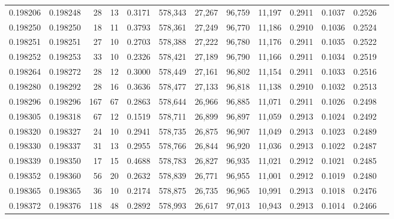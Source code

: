 \begin{tabular}{rrrrrrrrrrrrr}
0.198206 & 0.198248 &    28 &  13 &                                     0.3171 & 578,343 &  27,267 &  96,759 &  11,197 & 0.2911 & 0.1037 & 0.2526 \\
0.198250 & 0.198250 &    18 &  11 &                                     0.3793 & 578,361 &  27,249 &  96,770 &  11,186 & 0.2910 & 0.1036 & 0.2524 \\
0.198251 & 0.198251 &    27 &  10 &                                     0.2703 & 578,388 &  27,222 &  96,780 &  11,176 & 0.2911 & 0.1035 & 0.2522 \\
0.198252 & 0.198253 &    33 &  10 &                                     0.2326 & 578,421 &  27,189 &  96,790 &  11,166 & 0.2911 & 0.1034 & 0.2519 \\
0.198264 & 0.198272 &    28 &  12 &                                     0.3000 & 578,449 &  27,161 &  96,802 &  11,154 & 0.2911 & 0.1033 & 0.2516 \\
0.198280 & 0.198292 &    28 &  16 &                                     0.3636 & 578,477 &  27,133 &  96,818 &  11,138 & 0.2910 & 0.1032 & 0.2513 \\
0.198296 & 0.198296 &   167 &  67 &                                     0.2863 & 578,644 &  26,966 &  96,885 &  11,071 & 0.2911 & 0.1026 & 0.2498 \\
0.198305 & 0.198318 &    67 &  12 &                                     0.1519 & 578,711 &  26,899 &  96,897 &  11,059 & 0.2913 & 0.1024 & 0.2492 \\
0.198320 & 0.198327 &    24 &  10 &                                     0.2941 & 578,735 &  26,875 &  96,907 &  11,049 & 0.2913 & 0.1023 & 0.2489 \\
0.198330 & 0.198337 &    31 &  13 &                                     0.2955 & 578,766 &  26,844 &  96,920 &  11,036 & 0.2913 & 0.1022 & 0.2487 \\
0.198339 & 0.198350 &    17 &  15 &                                     0.4688 & 578,783 &  26,827 &  96,935 &  11,021 & 0.2912 & 0.1021 & 0.2485 \\
0.198352 & 0.198360 &    56 &  20 &                                     0.2632 & 578,839 &  26,771 &  96,955 &  11,001 & 0.2912 & 0.1019 & 0.2480 \\
0.198365 & 0.198365 &    36 &  10 &                                     0.2174 & 578,875 &  26,735 &  96,965 &  10,991 & 0.2913 & 0.1018 & 0.2476 \\
0.198372 & 0.198376 &   118 &  48 &                                     0.2892 & 578,993 &  26,617 &  97,013 &  10,943 & 0.2913 & 0.1014 & 0.2466 \\

\end{tabular}
